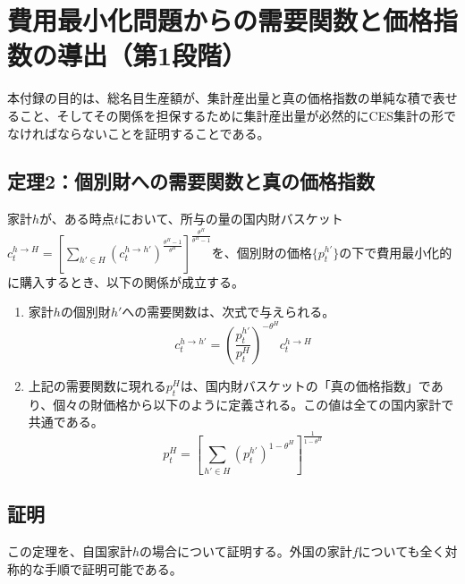 
\chapter{費用最小化問題からの需要関数と価格指数の導出（第1段階）}
\label{chap:appendix_cost_minimization}

本付録の目的は、総名目生産額が、集計産出量と真の価格指数の単純な積で表せること、そしてその関係を担保するために集計産出量が必然的にCES集計の形でなければならないことを証明することである。

\section*{定理2：個別財への需要関数と真の価格指数}
\label{sec:appendix_cost_minimization_theorem2}

家計\(h\)が、ある時点\(t\)において、所与の量の国内財バスケット\(c_t^{h\to H}=\left[\sum_{h'\in H}(c_t^{h\to h'})^{\frac{\theta^H-1}{\theta^H}}\right]^{\frac{\theta^H}{\theta^H-1}}\)を、個別財の価格\(\{p_t^{h'}\}\)の下で費用最小化的に購入するとき、以下の関係が成立する。
\begin{enumerate}
    \item\label{itm:appendix_cost_minimization_theorem2_1}家計\(h\)の個別財\(h'\)への需要関数は、次式で与えられる。
    \begin{equation}
    c_t^{h\to h'}=\left(\frac{p_t^{h'}}{p_t^H}\right)^{-\theta^H}c_t^{h\to H}
    \label{eq:appendix_cost_minimization_theorem2_individual_demand}
    \end{equation}
    \item\label{itm:appendix_cost_minimization_theorem2_2}上記の需要関数に現れる\(p_t^H\)は、国内財バスケットの「真の価格指数」であり、個々の財価格から以下のように定義される。この値は全ての国内家計で共通である。
    \begin{equation}
    p_t^H=\left[\sum_{h'\in H}(p_t^{h'})^{1-\theta^H}\right]^{\frac{1}{1-\theta^H}}
    \label{eq:appendix_cost_minimization_theorem2_price_index}
    \end{equation}
\end{enumerate}

\section*{証明}
\label{sec:appendix_cost_minimization_proof}

この定理を、自国家計\(h\)の場合について証明する。外国の家計\(f\)についても全く対称的な手順で証明可能である。

